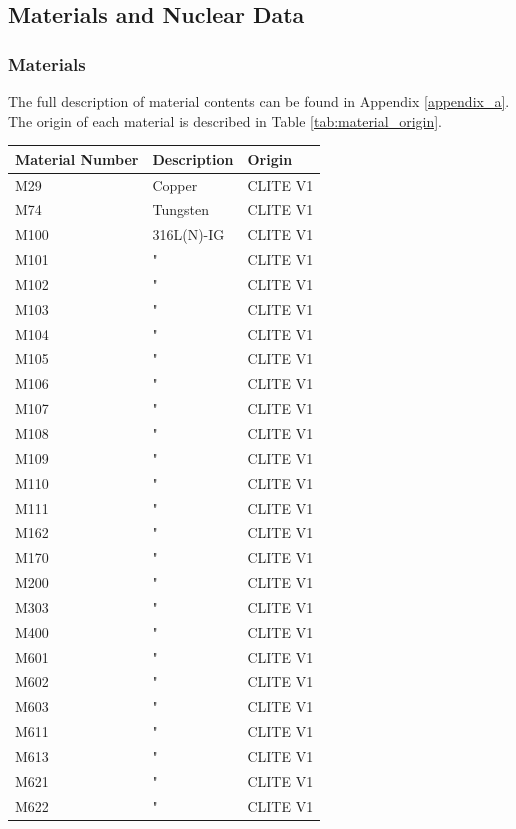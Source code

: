\documentclass[12pt]{article}
\begin{document}
\subsection{Materials and Nuclear Data}
\subsubsection{Materials}
The full description of material contents can be found in Appendix \ref{appendix_a}. The 
origin of each material is described in Table \ref{tab:material_origin}. 

\begin{centering}
 \begin{longtable}[ht!]{ p{} | p{} | p{} }
  \hline 
  Material Number & Description & Origin \\
  \hline
  M29  & Copper &  CLITE V1 \\
  M74  & Tungsten &  CLITE V1 \\
  M100  & 316L(N)-IG &  CLITE V1 \\
  M101  & " &  CLITE V1 \\
  M102  & " &  CLITE V1 \\
  M103  & " &  CLITE V1 \\
  M104  & " &  CLITE V1 \\
  M105  & " &  CLITE V1 \\
  M106  & " &  CLITE V1 \\
  M107  & " &  CLITE V1 \\
  M108  & " &  CLITE V1 \\
  M109  & " &  CLITE V1 \\
  M110  & " &  CLITE V1 \\
  M111  & " &  CLITE V1 \\
  M162  & " &  CLITE V1 \\
  M170  & " &  CLITE V1 \\
  M200  & " &  CLITE V1 \\
  M303  & " &  CLITE V1 \\
  M400  & " &  CLITE V1 \\
  M601  & " &  CLITE V1 \\
  M602  & " &  CLITE V1 \\
  M603  & " &  CLITE V1 \\
  M611  & " &  CLITE V1 \\
  M613  & " &  CLITE V1 \\
  M621  & " &  CLITE V1 \\
  M622  & " &  CLITE V1 \\

\end{longtable}
\end{centering}
\end{document}
